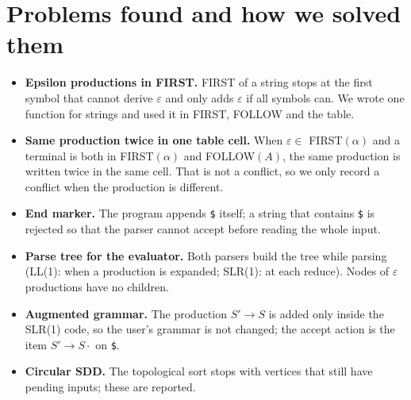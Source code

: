 \documentclass[11pt]{article}
\begin{document}
\section{Problems found and how we solved them}
\begin{itemize}
\item \textbf{Epsilon productions in FIRST.} FIRST of a string stops at the first symbol that cannot derive $\varepsilon$ and only adds
$\varepsilon$ if all symbols can. We wrote one function for strings and used it in FIRST, FOLLOW and the table.
\item \textbf{Same production twice in one table cell.} When $\varepsilon\in$ FIRST$(\alpha)$ and a terminal is both in FIRST$(\alpha)$ and FOLLOW$(A)$, the same production is written twice in the same cell. That is not a conflict, so we only record a conflict when the production is different.
\item \textbf{End marker.} The program appends \texttt{\$} itself; a string that contains \texttt{\$} is rejected so that the parser cannot accept before reading the whole input.
\item \textbf{Parse tree for the evaluator.} Both parsers build the tree while parsing (LL(1): when a production is expanded; SLR(1): at each reduce). Nodes of $\varepsilon$ productions have no children.
\item \textbf{Augmented grammar.} The production $S'\to S$ is added only inside the SLR(1) code, so the user's grammar is not changed; the accept action is the item $S'\to S\cdot$ on \texttt{\$}.
\item \textbf{Circular SDD.} The topological sort stops with vertices that still have pending inputs; these are reported.
\end{itemize}
\end{document}
